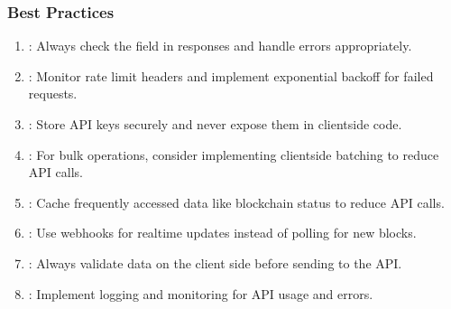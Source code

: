 \documentclass[letterpaper,10pt,english]{sphinxmanual}
\begin{document}
\subsubsection{Best Practices}
\label{\detokenize{api/rest-api:best-practices}}\begin{enumerate}
%
\item {} 
\sphinxAtStartPar
{}: Always check the  field in responses and handle errors appropriately.

\item {} 
\sphinxAtStartPar
{}: Monitor rate limit headers and implement exponential backoff for failed requests.

\item {} 
\sphinxAtStartPar
{}: Store API keys securely and never expose them in client\sphinxhyphen{}side code.

\item {} 
\sphinxAtStartPar
{}: For bulk operations, consider implementing client\sphinxhyphen{}side batching to reduce API calls.

\item {} 
\sphinxAtStartPar
{}: Cache frequently accessed data like blockchain status to reduce API calls.

\item {} 
\sphinxAtStartPar
{}: Use webhooks for real\sphinxhyphen{}time updates instead of polling for new blocks.

\item {} 
\sphinxAtStartPar
{}: Always validate data on the client side before sending to the API.

\item {} 
\sphinxAtStartPar
{}: Implement logging and monitoring for API usage and errors.

\end{enumerate}
\end{document}
